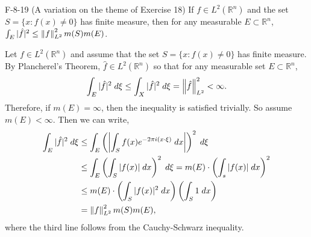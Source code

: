 \documentclass{article}
\begin{document}
	\begin{prb}{F-8-19}
		(A variation on the theme of Exercise 18) If $f \in L^{2}(\mathbb{R}^{n})$ and the set $S = \{x: f(x) \neq 0\}$ has finite measure, then for any measurable $E \subset \mathbb{R}^{n}$, $\int_{E}|\hat{f}|^{2} \leq \left\Vert f \right\Vert_{L^{2}}^{2}m(S)m(E)$. 
	\end{prb}
	Let $f \in L^{2}(\mathbb{R}^{n})$ and assume that the set $S = \{x: f(x) \neq 0\}$ has finite measure. By Plancherel's Theorem, $\hat{f} \in L^{2}(\mathbb{R}^{n})$ so that for any measurable set $E \subset \mathbb{R}^{n}$, 
	\begin{equation*}
		\int_{E}|\hat{f}|^{2}\;d\xi \leq \int_{X}|\hat{f}|^{2}\;d\xi = \left\Vert \hat{f} \right\Vert_{L^{2}}^{2} < \infty. 
	\end{equation*}
	Therefore, if $m(E) = \infty$, then the inequality is satisfied trivially. So assume $m(E) < \infty$. Then we can write, 
	\begin{align*}
		\begin{split}
			\int_{E}|\hat{f}|^{2}\;d\xi &\leq \int_{E}\left(\left| \int_{S}f(x)e^{-2\pi i (x\cdot \xi)}\;dx \right|\right)^{2}\;d\xi \\
			&\leq \int_{E}\left(\int_{S}|f(x)|\;dx\right)^{2}\;d\xi = m(E) \cdot \left(\int_{s}|f(x)|\;dx\right)^{2} \\
			&\leq m(E) \cdot \left(\int_{S}|f(x)|^{2}\;dx\right)\left(\int_{S}1\;dx\right) \\
			&= \left\Vert f \right\Vert_{L^{2}}^{2}m(S)m(E), 
		\end{split}
	\end{align*}
	where the third line follows from the Cauchy-Schwarz inequality. 
\end{document}
